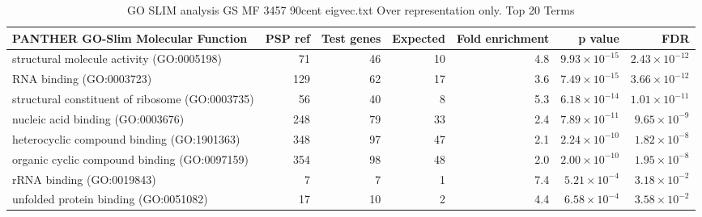 \begin{table}[ht]
\centering
\begin{adjustbox}{width=\textwidth}
\begin{tabular}{lrrrrrr}
  \hline
PANTHER GO-Slim Molecular Function & PSP ref & Test genes & Expected & Fold enrichment & p value & FDR \\ 
  \hline
structural molecule activity (GO:0005198) & 71 & 46 & 10 & 4.8 & $9.93 \times 10^{-15}$ & $2.43 \times 10^{-12}$ \\ 
  RNA binding (GO:0003723) & 129 & 62 & 17 & 3.6 & $7.49 \times 10^{-15}$ & $3.66 \times 10^{-12}$ \\ 
  structural constituent of ribosome (GO:0003735) & 56 & 40 & 8 & 5.3 & $6.18 \times 10^{-14}$ & $1.01 \times 10^{-11}$ \\ 
  nucleic acid binding (GO:0003676) & 248 & 79 & 33 & 2.4 & $7.89 \times 10^{-11}$ & $9.65 \times 10^{-9}$ \\ 
  heterocyclic compound binding (GO:1901363) & 348 & 97 & 47 & 2.1 & $2.24 \times 10^{-10}$ & $1.82 \times 10^{-8}$ \\ 
  organic cyclic compound binding (GO:0097159) & 354 & 98 & 48 & 2.0 & $2.00 \times 10^{-10}$ & $1.95 \times 10^{-8}$ \\ 
  rRNA binding (GO:0019843) & 7 & 7 & 1 & 7.4 & $5.21 \times 10^{-4}$ & $3.18 \times 10^{-2}$ \\ 
  unfolded protein binding (GO:0051082) & 17 & 10 & 2 & 4.4 & $6.58 \times 10^{-4}$ & $3.58 \times 10^{-2}$ \\ 
   \hline
\end{tabular}
\end{adjustbox}
\caption{GO SLIM analysis GS MF 3457 90cent eigvec.txt Over representation only. Top 20 Terms} 
\label{tab:GO SLIM analysis GS MF 3457 90cent eigvec.txt Over representation only. Top 20 Terms}
\end{table}



